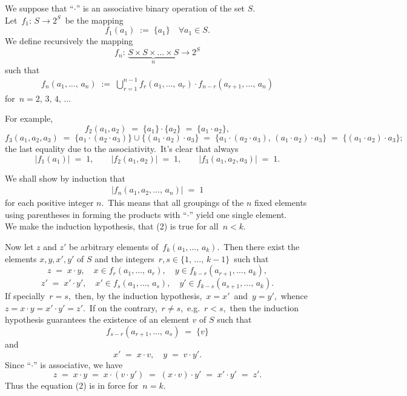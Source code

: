 \documentclass[12pt]{article}
\theoremstyle{definition}
\begin{document}
 

We suppose that ``$\cdot$'' is an associative binary operation of the set $S$.\\

Let\, $f_1\!:\,S \to 2^S$\, be the mapping
         $$f_1(a_1) \;:=\; \{a_1\} \quad \forall a_1 \in S.$$
We define recursively the mapping
$$f_n\!:\,\underbrace{S\!\times\!S\!\times\!\ldots\!\times\!S}_n \to 2^S$$
such that
\begin{align}
f_n(a_1,\ldots,\,a_n) \;:=\; \bigcup_{r=1}^{n-1}f_r(a_1,\ldots,\,a_r)\cdot f_{n-r}(a_{r+1},\ldots,\,a_n)
\end{align}
for\, $n = 2,\,3,\,4,\,\ldots$

For example,
$$f_2(a_1,a_2) \;=\; \{a_1\}\cdot\{a_2\} \;=\; \{a_1\cdot a_2\},$$
$$f_3(a_1,a_2,a_3) \;=\; \{a_1\cdot(a_2\cdot a_3)\}\cup\{(a_1\cdot a_2)\cdot a_3\} \;=\; 
\{a_1\cdot(a_2\cdot a_3),\,(a_1\cdot a_2)\cdot a_3\} \;=\; \{(a_1\cdot a_2)\cdot a_3\};$$
the last equality due to the associativity.\, It's clear that always
$$|f_1(a_1)|\;=\; 1,\qquad |f_2(a_1,a_2)| \;=\; 1,
\qquad |f_3(a_1,a_2,a_3)| \;=\; 1.$$

We shall show by induction that
\begin{align}
|f_n(a_1,a_2,\ldots,\,a_n)| \;=\; 1
\end{align}
for each positive integer $n$.\, This means that all groupings of the $n$ fixed elements using parentheses in forming the products with ``$\cdot$'' yield one single element.\\

We make the induction hypothesis, that (2) is true for all\, $n < k.$

Now let $z$ and $z'$ be arbitrary elements of\, $f_k(a_1,\ldots,\,a_k)$.\, 
Then there exist the elements $x,y,x',y'$ of $S$ and the 
integers\, $r, s \in \{1,\,\ldots,\,k\!-\!1\}$\, such that 
$$z \;=\; x\cdot y,\quad x \in f_r(a_1,\ldots,\,a_r),\quad y \in f_{k-r}(a_{r+1},\ldots,\, a_k),$$
$$z' \;=\; x'\cdot y',\quad x' \in f_s(a_1,\ldots,\,a_s),\quad y' \in f_{k-s}(a_{s+1},\ldots,\, a_k).$$
If specially\, $r = s$,\, then, by the induction hypothesis,\, $x = x'$\, and\, $y = y'$,\, whence\, $z = x\cdot y = x'\cdot y' = z'$.\, If on the contrary,\, $r \neq s$,\, e.g.\, $r < s$,\, then the induction hypothesis guarantees the existence of an element $v$ of $S$ such that 
$$f_{s-r}(a_{r+1},\ldots,\,a_s) \;=\; \{v\}$$
and
$$x' \;=\; x\cdot v,\quad y \;=\; v\cdot y'.$$
Since ``$\cdot$'' is associative, we have
$$z \;=\; x\cdot y \;=\; x\cdot(v\cdot y') \;=\; (x\cdot v)\cdot y' \;=\; x'\cdot y' \;=\; z'.$$
Thus the equation (2) is in force for\, $n = k$.




\end{document}
